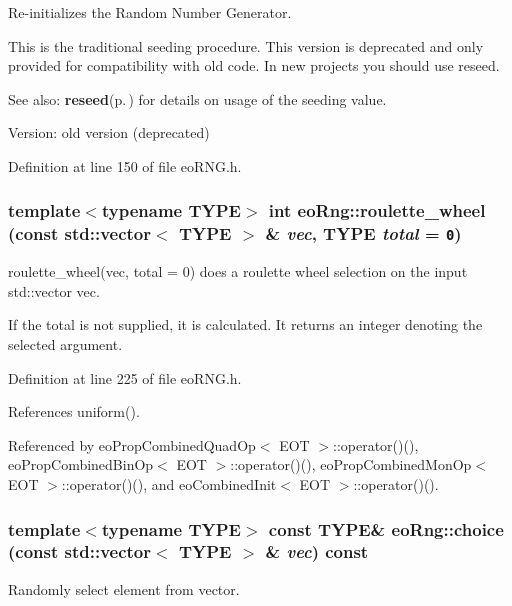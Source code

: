 Re-initializes the Random Number Generator. 

This is the traditional seeding procedure. This version is deprecated and only provided for compatibility with old code. In new projects you should use reseed.

\begin{Desc}
\item[See also:]{\bf reseed}{\rm (p.\,\pageref{classeo_rng_a2})} for details on usage of the seeding value.\end{Desc}
\begin{Desc}
\item[Version:]old version (deprecated) \end{Desc}


Definition at line 150 of file eo\-RNG.h.
\subsubsection{\setlength{\rightskip}{0pt plus 5cm}template$<$typename TYPE$>$ int eo\-Rng::roulette\_\-wheel (const std::vector$<$ TYPE $>$ \& {\em vec}, TYPE {\em total} = {\tt 0})\hspace{0.3cm}{\tt  [inline]}}\label{classeo_rng_a13}


roulette\_\-wheel(vec, total = 0) does a roulette wheel selection on the input std::vector vec. 

If the total is not supplied, it is calculated. It returns an integer denoting the selected argument. 

Definition at line 225 of file eo\-RNG.h.

References uniform().

Referenced by eo\-Prop\-Combined\-Quad\-Op$<$ EOT $>$::operator()(), eo\-Prop\-Combined\-Bin\-Op$<$ EOT $>$::operator()(), eo\-Prop\-Combined\-Mon\-Op$<$ EOT $>$::operator()(), and eo\-Combined\-Init$<$ EOT $>$::operator()().
\subsubsection{\setlength{\rightskip}{0pt plus 5cm}template$<$typename TYPE$>$ const TYPE\& eo\-Rng::choice (const std::vector$<$ TYPE $>$ \& {\em vec}) const\hspace{0.3cm}{\tt  [inline]}}\label{classeo_rng_a14}


Randomly select element from vector. 

